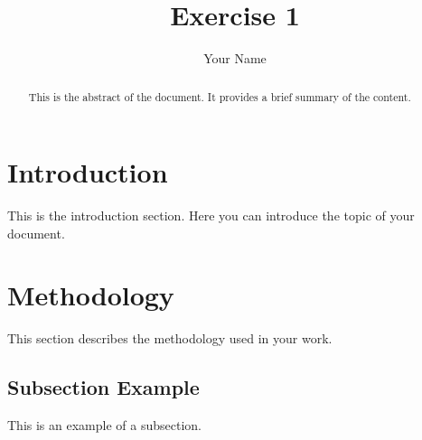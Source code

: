 \documentclass[a4paper,12pt]{article}
\title{Exercise 1}
\author{Your Name}
\begin{document}
\maketitle

\begin{abstract}
This is the abstract of the document. It provides a brief summary of the content.
\end{abstract}

\tableofcontents
\newpage

\section{Introduction}
This is the introduction section. Here you can introduce the topic of your document.

\section{Methodology}
This section describes the methodology used in your work.

\subsection{Subsection Example}
This is an example of a subsection.
\end{document}
